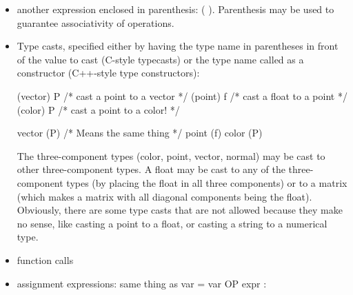 \documentclass[11pt,letterpaper]{book}
\def\color{{\cf color}\xspace}
\def\float{{\cf float}\xspace}
\def\inttype{{\cf int}\xspace}
\def\normal{{\cf normal}\xspace}
\def\point{{\cf point}\xspace}
\def\vector{{\cf vector}\xspace}
\begin{document}
\begin{itemize}
\hspace{0.5in}  \emph{expr1} {\cf \&\&} \emph{expr2}

\hspace{0.5in}    \emph{expr1} {\cf ||} \emph{expr2}

For the logical operators, numeric expressions (\inttype or \float) are
considered \emph{true} if nonzero, \emph{false} if zero.
Multi-component types (such as \color) are considered \emph{true} any
component is nonzero, \emph{false} all components are zero.  Strings are
considered \emph{true} if they are nonempty, \emph{false} if they are
the empty string (\qkw{}).

\item another expression enclosed in parenthesis: {\cf ( )}.
  Parenthesis may be used to guarantee associativity of operations.

\item Type casts, specified either by having the type name in 
parentheses in front of the value to cast (C-style typecasts)
or the type name called as a constructor (C++-style type constructors):
\begin{code}
        (vector) P            /* cast a point to a vector */
        (point) f             /* cast a float to a point */
        (color) P             /* cast a point to a color! */

        vector (P)            /* Means the same thing */
        point (f)
        color (P)
\end{code}

The three-component types (\color, \point, \vector, \normal)
may be cast to other three-component types.  A \float
may be cast to any of the three-component types (by placing the
float in all three components) or to a {\cf matrix} (which makes a
matrix with all diagonal components being the {\cf float}).
Obviously, there are some type casts that are not allowed because
they make no sense, like casting a {\cf point} to a {\cf float}, or
casting a {\cf string} to a numerical type.

\item function calls

\item assignment expressions:
same thing as {\cf var = var OP expr} :


\end{itemize}
\end{document}
